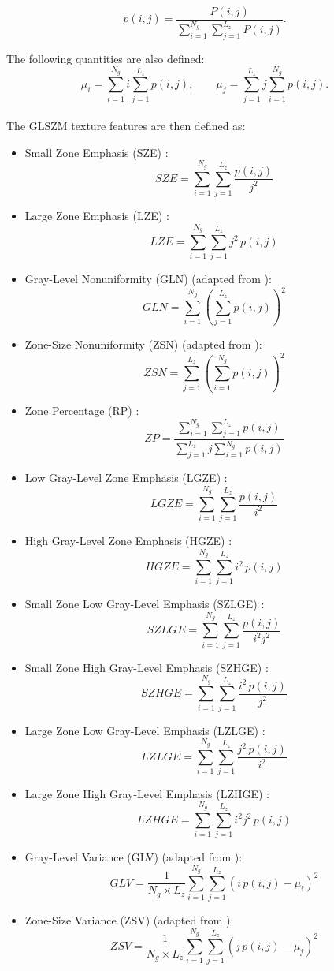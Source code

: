 \documentclass{article}
\begin{document}
\[p(i,j) = \frac{P(i,j)}{\sum_{i=1}^{N_g}\sum_{j=1}^{L_z} P(i,j)}.\]

\noindent The following quantities are also defined:
\[\mu_i = \sum_{i=1}^{N_g} i \sum_{j=1}^{L_z} p(i,j), \qquad \mu_j = \sum_{j=1}^{L_z} j \sum_{i=1}^{N_g} p(i,j).\] \\

\noindent The GLSZM texture features are then defined as:

\begin{itemize}
	\item Small Zone Emphasis (SZE) \cite{GallowayMM1975,ThibaultG2009}:
		  \[SZE = \sum_{i=1}^{N_g}\sum_{j=1}^{L_z} \frac{p(i,j)}{j^2}\]
	\item Large Zone Emphasis (LZE) \cite{GallowayMM1975,ThibaultG2009}:
		  \[LZE = \sum_{i=1}^{N_g}\sum_{j=1}^{L_z} j^2\,p(i,j)\]
	\item Gray-Level Nonuniformity (GLN) (adapted from \cite{GallowayMM1975,ThibaultG2009}):
		  \[GLN = \sum_{i=1}^{N_g}\left(\sum_{j=1}^{L_z} p(i,j)\right)^2\]
	\item Zone-Size Nonuniformity (ZSN) (adapted from \cite{GallowayMM1975,ThibaultG2009}):
		  \[ZSN = \sum_{j=1}^{L_z}\left(\sum_{i=1}^{N_g} p(i,j)\right)^2\]
	\item Zone Percentage (RP) \cite{GallowayMM1975,ThibaultG2009}:
		  \[ZP = \frac{\sum_{i=1}^{N_g}\sum_{j=1}^{L_z} p(i,j)}{\sum_{j=1}^{L_z} j 
		  \sum_{i=1}^{N_g} p(i,j)}\]
	\item Low Gray-Level Zone Emphasis (LGZE) \cite{ChuA1990,ThibaultG2009}:
		  \[LGZE = \sum_{i=1}^{N_g}\sum_{j=1}^{L_z} \frac{p(i,j)}{i^2}\]
	\item High Gray-Level Zone Emphasis (HGZE) \cite{ChuA1990,ThibaultG2009}:
		  \[HGZE = \sum_{i=1}^{N_g}\sum_{j=1}^{L_z} i^2\,p(i,j)\]
	\item Small Zone Low Gray-Level Emphasis (SZLGE) \cite{DasarathyBV1991,ThibaultG2009}:
		  \[SZLGE = \sum_{i=1}^{N_g}\sum_{j=1}^{L_z} \frac{p(i,j)}{i^2j^2}\]
	\item Small Zone High Gray-Level Emphasis (SZHGE) \cite{DasarathyBV1991,ThibaultG2009}:
		  \[SZHGE = \sum_{i=1}^{N_g}\sum_{j=1}^{L_z} \frac{i^2\,p(i,j)}{j^2}\]
	\item Large Zone Low Gray-Level Emphasis (LZLGE) \cite{DasarathyBV1991,ThibaultG2009}:
		  \[LZLGE = \sum_{i=1}^{N_g}\sum_{j=1}^{L_z} \frac{j^2\,p(i,j)}{i^2}\]
	\item Large Zone High Gray-Level Emphasis (LZHGE) \cite{DasarathyBV1991,ThibaultG2009}:
		  \[LZHGE = \sum_{i=1}^{N_g}\sum_{j=1}^{L_z} i^2j^2\,p(i,j)\]
	\item Gray-Level Variance (GLV) (adapted from \cite{ThibaultG2009}):
		  \[GLV = \frac{1}{N_g \times L_z} \sum_{i=1}^{N_g}\sum_{j=1}^{L_z} 
		  \left(i\,p(i,j)-\mu_i\right)^2\]
	\item Zone-Size Variance (ZSV) (adapted from \cite{ThibaultG2009}):
		  \[ZSV = \frac{1}{N_g \times L_z} \sum_{i=1}^{N_g}\sum_{j=1}^{L_z} 
		  \left(j\,p(i,j)-\mu_j\right)^2\]
	\\
\end{itemize}
\end{document}
